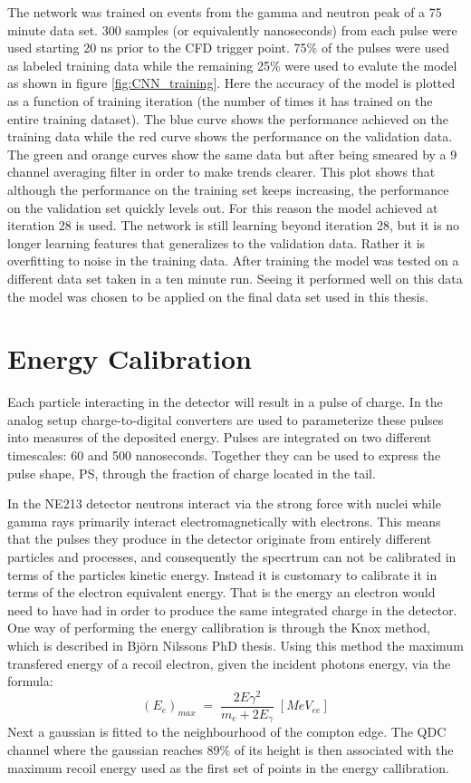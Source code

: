 \documentclass[main.tex]{subfiles}
\begin{document}
The network was trained on events from the gamma and neutron peak of a 75 minute data set. 300 samples (or equivalently nanoseconds) from each pulse were used starting 20 ns prior to the CFD trigger point. 75\% of the pulses were used as labeled training data while the remaining 25\% were used to evalute the model as shown in figure \ref{fig:CNN_training}. Here the accuracy of the model is plotted as a function of training iteration (the number of times it has trained on the entire training dataset). The blue curve shows the performance achieved on the training data while the red curve shows the performance on the validation data. The green and orange curves show the same data but after being smeared by a 9 channel averaging filter in order to make trends clearer. This plot shows that although the performance on the training set keeps increasing, the performance on the validation set quickly levels out. For this reason the model achieved at iteration 28 is used. The network is still learning beyond iteration 28, but it is no longer learning features that generalizes to the validation data. Rather it is overfitting to noise in the training data. After training the model was tested on a different data set taken in a ten minute run. Seeing it performed well on this data the model was chosen to be applied on the final data set used in this thesis.


\section{Energy Calibration}
Each particle interacting in the detector will result in a pulse of charge. In the analog setup charge-to-digital converters are used to parameterize these pulses into measures of the deposited energy. Pulses are integrated on two different timescales: 60 and 500 nanoseconds. Together they can be used to express the pulse shape, PS, through the fraction of charge located in the tail.

In the NE213 detector neutrons interact via the strong force with nuclei while gamma rays primarily interact electromagnetically with electrons. This means that the pulses they produce in the detector originate from entirely different particles and processes, and consequently the specrtrum can not be calibrated in terms of the particles kinetic energy. Instead it is customary to calibrate it in terms of the electron equivalent energy. That is the energy an electron would need to have had in order to produce the same integrated charge in the detector. One way of performing the energy callibration is through the Knox method, which is described in Björn Nilssons PhD thesis\cite[pg. 55]{Nilsson}. Using this method the maximum transfered energy of a recoil electron, given the incident photons energy, via the formula:
\begin{equation}
	(E_{e})_{max}\;=\;\frac{2E\gamma^2}{m_e + 2E_\gamma} \;[MeV_{ee}]
\end{equation}
Next a gaussian is fitted to the neighbourhood of the compton edge. The QDC channel where the gaussian reaches 89\% of its height is then associated with the maximum recoil energy used as the first set of points in the energy callibration.
\end{document}
